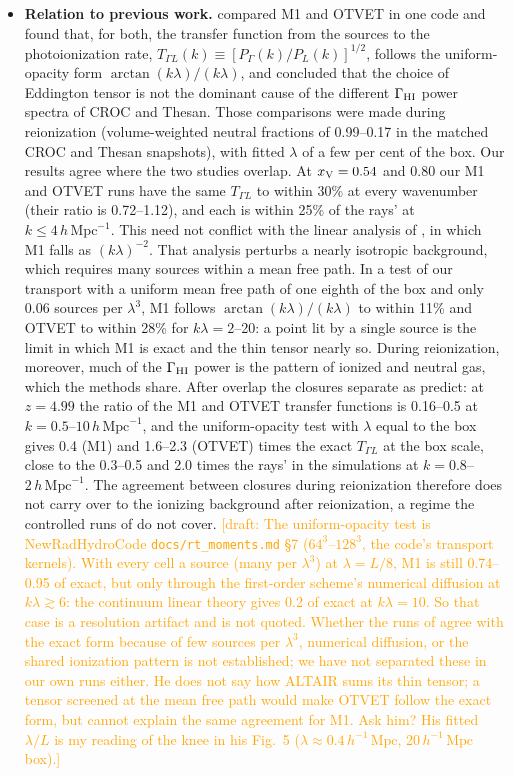 \documentclass[iop]{openjournal}
\renewcommand{\draft}[1]{\textcolor{orange}{[draft: #1]}}%
\newcommand{\hmpc}{\,h\,\mathrm{Mpc}^{-1}}
\newcommand{\mpch}{\,h^{-1}\,\mathrm{Mpc}}
\newcommand{\xv}{x_{\rm V}}
\begin{document}
\begin{itemize}
\item \textbf{Relation to previous work.} \citet{gnedin25} compared M1 and OTVET in one code and found that, for both, the transfer function from the sources to the photoionization rate, $T_{\Gamma L}(k)\equiv[P_\Gamma(k)/P_L(k)]^{1/2}$, follows the uniform-opacity form $\arctan(k\lambda)/(k\lambda)$, and concluded that the choice of Eddington tensor is not the dominant cause of the different $\Gamma_{\rm HI}$ power spectra of CROC and Thesan. Those comparisons were made during reionization (volume-weighted neutral fractions of 0.99--0.17 in the matched CROC and Thesan snapshots), with fitted $\lambda$ of a few per cent of the box. Our results agree where the two studies overlap. At $\xv=0.54$ and 0.80 our M1 and OTVET runs have the same $T_{\Gamma L}$ to within 30\% at every wavenumber (their ratio is 0.72--1.12), and each is within 25\% of the rays' at $k\le4\hmpc$. This need not conflict with the linear analysis of \citet{wu21}, in which M1 falls as $(k\lambda)^{-2}$. That analysis perturbs a nearly isotropic background, which requires many sources within a mean free path. In a test of our transport with a uniform mean free path of one eighth of the box and only 0.06 sources per $\lambda^3$, M1 follows $\arctan(k\lambda)/(k\lambda)$ to within 11\% and OTVET to within 28\% for $k\lambda=2$--20: a point lit by a single source is the limit in which M1 is exact and the thin tensor nearly so. During reionization, moreover, much of the $\Gamma_{\rm HI}$ power is the pattern of ionized and neutral gas, which the methods share. After overlap the closures separate as \citet{wu21} predict: at $z=4.99$ the ratio of the M1 and OTVET transfer functions is 0.16--0.5 at $k=0.5$--$10\hmpc$, and the uniform-opacity test with $\lambda$ equal to the box gives 0.4 (M1) and 1.6--2.3 (OTVET) times the exact $T_{\Gamma L}$ at the box scale, close to the 0.3--0.5 and 2.0 times the rays' in the simulations at $k=0.8$--$2\hmpc$. The agreement between closures during reionization therefore does not carry over to the ionizing background after reionization, a regime the controlled runs of \citet{gnedin25} do not cover. \draft{The uniform-opacity test is NewRadHydroCode \texttt{docs/rt\_moments.md} \S7 ($64^3$--$128^3$, the code's transport kernels). With every cell a source (many per $\lambda^3$) at $\lambda=L/8$, M1 is still 0.74--0.95 of exact, but only through the first-order scheme's numerical diffusion at $k\lambda\gtrsim6$: the continuum linear theory gives 0.2 of exact at $k\lambda=10$. So that case is a resolution artifact and is not quoted. Whether the runs of \citet{gnedin25} agree with the exact form because of few sources per $\lambda^3$, numerical diffusion, or the shared ionization pattern is not established; we have not separated these in our own runs either. He does not say how ALTAIR sums its thin tensor; a tensor screened at the mean free path would make OTVET follow the exact form, but cannot explain the same agreement for M1. Ask him? His fitted $\lambda/L$ is my reading of the knee in his Fig.~5 ($\lambda\approx0.4\mpch$, 20$\mpch$ box).}


\end{itemize}
\end{document}
